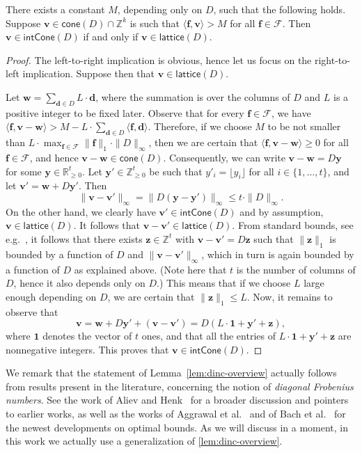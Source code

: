\documentclass{theoretics}
\renewcommand{\leq}{\leqslant}
\renewcommand{\geq}{\geqslant}
\newcommand{\Z}{\mathbb{Z}}
\newcommand{\Zn}{\Z_{\geq 0}}
\newcommand{\R}{\mathbb{R}}
\newcommand{\myRn}{\R_{\geq 0}} %
\newcommand{\tup}[1]{{\mathbf{#1}}}
\newcommand{\ww}{\tup w}
\newcommand{\yy}{\tup y}
\newcommand{\zz}{\tup z}
\newcommand{\ff}{\tup f}
\newcommand{\dd}{\tup d}
\newcommand{\myvv}{\tup v} %
\newcommand{\Ff}{\mathcal{F}}
\newcommand{\sca}[2]{\langle #1,#2\rangle}
\newcommand{\realcone}{\mathsf{cone}}
\newcommand{\intcone}{\mathsf{intCone}}
\newcommand{\lattice}{\mathsf{lattice}}
\begin{document}
\begin{lemma}\label{lem:dinc-overview}
 There exists a constant $M$, depending only on $D$, such that the following holds.
 Suppose $\myvv\in \realcone(D)\cap \Z^k$ is such that $\sca{\ff}{\myvv}>M$ for all $\ff\in \Ff$. Then $\myvv\in \intcone(D)$ if and only if $\myvv\in \lattice(D)$.
\end{lemma}
\begin{proof}
 The left-to-right implication is obvious, hence let us focus on the right-to-left implication. Suppose then that $\myvv\in \lattice(D)$.

 Let $\ww=\sum_{\dd\in D} L\cdot \dd$, where the summation is over the columns of $D$ and $L$ is a positive integer to be fixed later. Observe that for every $\ff\in \Ff$, we have $\sca{\ff}{\myvv-\ww}> M-L\cdot \sum_{\dd\in D}\sca{\ff}{\dd}$. Therefore, if we choose $M$ to be not smaller than $L\cdot \max_{\ff\in \Ff}\|\ff\|_1\cdot \|D\|_\infty$, then we are certain that $\sca{\ff}{\myvv-\ww}\geq 0$ for all $\ff\in \Ff$, and hence $\myvv-\ww\in \realcone(D)$. Consequently, we can write $\myvv-\ww=D\yy$ for some $\yy\in \myRn^t$. Let $\yy'\in \Zn^t$ be such that $y'_i=\lfloor y_i\rfloor$ for all $i\in \{1,\ldots,t\}$, and let $\myvv'=\ww+D\yy'$. Then
 $$\|\myvv-\myvv'\|_\infty = \|D(\yy-\yy')\|_\infty\leq t\cdot \|D\|_\infty.$$
 On the other hand, we clearly have $\myvv'\in \intcone(D)$ and by assumption, $\myvv\in \lattice(D)$. It follows that $\myvv-\myvv'\in \lattice(D)$. From standard bounds, see e.g.~\cite{Pottier91}, it follows that there exists $\zz\in \Z^t$ with $\myvv-\myvv'=D\zz$ such that $\|\zz\|_1$ is bounded by a function of $D$ and $\|\myvv-\myvv'\|_\infty$, which in turn is again bounded by a function of $D$ as explained above. (Note here that $t$ is the number of columns of $D$, hence it also depends only on $D$.) This means that if we choose $L$ large enough depending on $D$, we are certain that $\|\zz\|_1\leq L$. Now, it remains to observe that
 $$\myvv=\ww+D\yy'+(\myvv-\myvv')=D(L\cdot \boldsymbol{1}+\yy'+\zz),$$
 where $\boldsymbol{1}$ denotes the vector of $t$ ones, and that all the entries of $L\cdot \boldsymbol{1}+\yy'+\zz$ are nonnegative integers. This proves that $\myvv\in \intcone(D)$.
\end{proof}

We remark that the statement of Lemma~\ref{lem:dinc-overview} actually follows from results present in the literature, concerning the notion of {\em{diagonal Frobenius numbers}}. See the work of Aliev and Henk~\cite{AlievH10} for a broader discussion and pointers to earlier works, as well as the works of Aggrawal et al.~\cite{AggrawalJSW24} and of Bach et al.~\cite{BachERW24} for the newest developments on optimal bounds. As we will discuss in a moment, in this work we actually use a generalization of \cref{lem:dinc-overview}.
\end{document}
